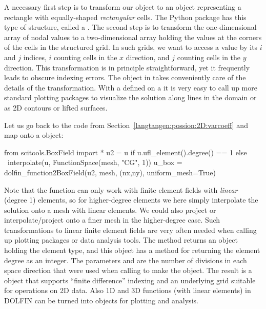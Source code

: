 A necessary first step is to transform our
 object to an object representing
a rectangle with equally-shaped \emph{rectangular} cells.  The Python
package  has this type of
structure, called a
. The second step is to
transform the one-dimensional array of nodal values to a
two-dimensional array holding the values at the corners of the cells
in the structured grid. In such grids, we want to access a value by
its $i$ and $j$ indices, $i$ counting cells in the $x$ direction, and
$j$ counting cells in the $y$ direction.  This transformation is in
principle straightforward, yet it frequently leads to obscure indexing
errors. The  object in
 takes conveniently care of
the details of the transformation.  With a
 defined on a
 it is very easy to call
up more standard plotting packages to visualize the solution along
lines in the domain or as 2D contours or lifted surfaces.

Let us go back to the  code from
Section~\ref{langtangen:possion:2D:varcoeff} and map  onto a
 object:
\begin{python}
from scitools.BoxField import *
u2 = u if u.ufl_element().degree() == 1 else \
     interpolate(u, FunctionSpace(mesh, "CG", 1))
u_box = dolfin_function2BoxField(u2, mesh, (nx,ny), uniform_mesh=True)
\end{python}
Note that the function
 can only work
with finite element fields with \emph{linear} (degree 1) elements, so
for higher-degree elements we here simply interpolate the solution
onto a mesh with linear elements. We could also project
 or interpolate/project onto a finer
mesh in the higher-degree case.  Such transformations to linear finite
element fields are very often needed when calling up plotting packages
or data analysis tools.  The
 method returns an object
holding the element type, and this object has a method
 for returning the element
degree as an integer.  The parameters
 and
 are the number of divisions in each
space direction that were used when calling
 to make the
 object.  The result
 is a
 object that supports ``finite
difference'' indexing and an underlying grid suitable for
 operations on 2D data.  Also 1D
and 3D functions (with linear elements) in DOLFIN can be turned
into  objects for plotting and
analysis.

